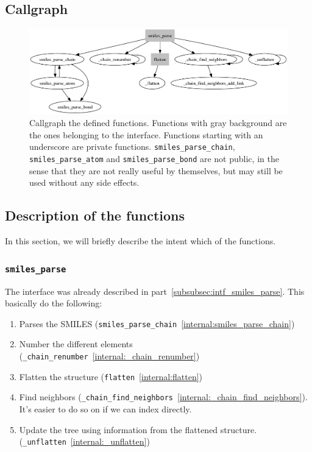 \documentclass[a4paper, 11pt]{article}
\begin{document}
\subsection{Callgraph}

\begin{figure}[H]
    \begin{center}
        \includegraphics[width=\columnwidth]{images/callgraph.pdf}
    \end{center}
    \caption[Callgraph]{\label{fig:callgraph} Callgraph the defined functions. Functions with gray background are the ones belonging to the interface. Functions starting with an underscore are private functions. \texttt{smiles\_parse\_chain}, \texttt{smiles\_parse\_atom} and \texttt{smiles\_parse\_bond} are not public, in the sense that they are not really useful by themselves, but may still be used without any side effects.}
\end{figure}


\subsection{Description of the functions}

In this section, we will briefly describe the intent which of the functions.

\subsubsection{\tt smiles\_parse}\label{internal:smiles_parse}
The interface was already described in part~\ref{subsubsec:intf_smiles_parse}. This basically do the following:
\begin{enumerate}
    \item Parses the SMILES ({\tt smiles\_parse\_chain}~\ref{internal:smiles_parse_chain})
    \item Number the different elements ({\tt \_chain\_renumber}~\ref{internal:_chain_renumber})
    \item Flatten the structure ({\tt flatten}~\ref{internal:flatten})
    \item Find neighbors ({\tt \_chain\_find\_neighbors}~\ref{internal:_chain_find_neighbors}). It's easier to do so on if we can index directly.
    \item Update the tree using information from the flattened structure. ({\tt \_unflatten}~\ref{internal:_unflatten})
\end{enumerate}
\end{document}
